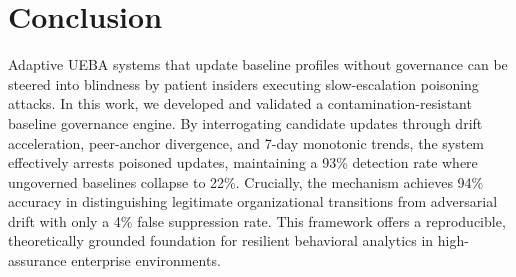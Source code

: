 \documentclass[conference]{IEEEtran}
\begin{document}
\section{Conclusion}
\label{sec:conclusion}
Adaptive UEBA systems that update baseline profiles without governance can be steered into blindness by patient insiders executing slow-escalation poisoning attacks. In this work, we developed and validated a contamination-resistant baseline governance engine. By interrogating candidate updates through drift acceleration, peer-anchor divergence, and 7-day monotonic trends, the system effectively arrests poisoned updates, maintaining a 93\% detection rate where ungoverned baselines collapse to 22\%. Crucially, the mechanism achieves 94\% accuracy in distinguishing legitimate organizational transitions from adversarial drift with only a 4\% false suppression rate. This framework offers a reproducible, theoretically grounded foundation for resilient behavioral analytics in high-assurance enterprise environments.



\end{document}
